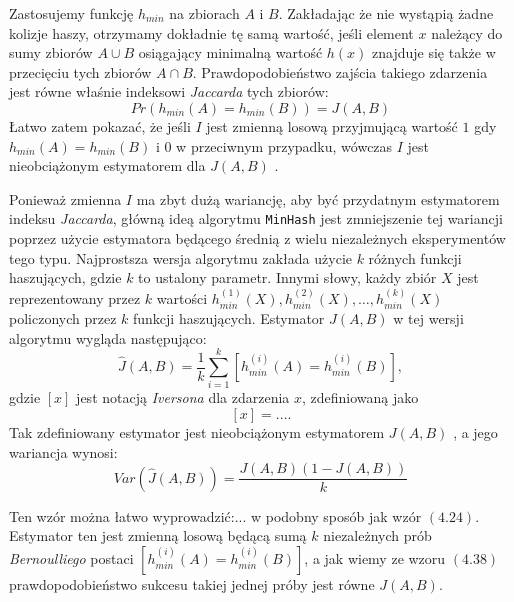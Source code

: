 Zastosujemy funkcję $h_{min}$ na zbiorach $A$ i $B$. Zakładając że nie wystąpią żadne kolizje haszy, otrzymamy dokładnie tę samą wartość, jeśli element $x$ należący do sumy zbiorów $A \cup B$ osiągający minimalną wartość $h(x)$ znajduje się także w przecięciu tych zbiorów $A \cap B$. Prawdopodobieństwo zajścia takiego zdarzenia jest równe właśnie indeksowi \textit{Jaccarda} tych zbiorów:
\begin{equation}
    Pr(h_{min}(A) = h_{min}(B)) = J(A, B)
\end{equation}
Łatwo zatem pokazać, że jeśli $I$ jest zmienną losową przyjmującą wartość $1$ gdy $h_{min}(A) = h_{min}(B)$ i $0$ w przeciwnym przypadku, wówczas $I$ jest nieobciążonym estymatorem dla $J(A, B)$ \cite{minhash}.

Ponieważ zmienna $I$ ma zbyt dużą wariancję, aby być przydatnym estymatorem indeksu \textit{Jaccarda}, główną ideą algorytmu \texttt{MinHash} jest zmniejszenie tej wariancji poprzez użycie estymatora będącego średnią z wielu niezależnych eksperymentów tego typu. Najprostsza wersja algorytmu zakłada użycie $k$ różnych funkcji haszujących, gdzie $k$ to ustalony parametr. Innymi słowy, każdy zbiór $X$ jest reprezentowany przez $k$ wartości $h^{(1)}_{min}(X), h^{(2)}_{min}(X), \ldots, h^{(k)}_{min}(X)$ policzonych przez $k$ funkcji haszujących.
Estymator $J(A, B)$ w tej wersji algorytmu wygląda następująco:
\begin{equation}
    \hat{J}(A, B) = \frac{1}{k}\sum_{i=1}^{k}[h_{min}^{(i)}(A) = h_{min}^{(i)}(B)],
    \label{jacc_est}
\end{equation}
gdzie $[x]$ jest notacją \textit{Iversona} dla zdarzenia $x$, zdefiniowaną jako 
$$[x] = ... .$$ 
Tak zdefiniowany estymator jest nieobciążonym estymatorem $J(A, B)$ \cite{minhash}, a jego wariancja wynosi:
\begin{equation}
    Var(\hat{J}(A,B)) = \frac{J(A, B)(1 - J(A, B))}{k}
\end{equation}

Ten wzór można łatwo wyprowadzić:...
 w podobny sposób jak wzór $(4.24)$.  Estymator ten jest zmienną losową będącą sumą $k$ niezależnych prób \textit{Bernoulliego} postaci $[h_{min}^{(i)}(A) = h_{min}^{(i)}(B)]$, a jak wiemy ze wzoru $(4.38)$ prawdopodobieństwo sukcesu takiej jednej próby jest równe $J(A, B)$.

